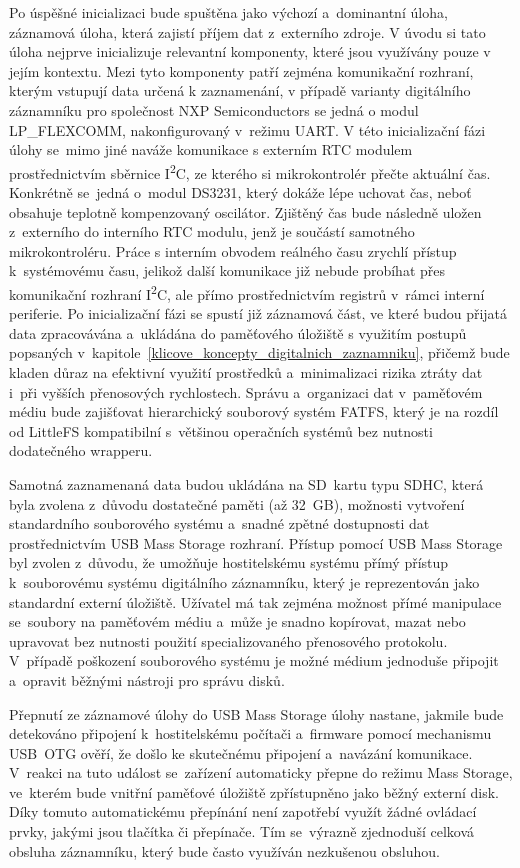 Po úspěšné inicializaci bude spuštěna jako výchozí a~dominantní úloha, záznamová úloha, která zajistí příjem dat z~externího zdroje. V úvodu si tato úloha nejprve inicializuje relevantní komponenty, které jsou využívány pouze v jejím kontextu. Mezi tyto komponenty patří zejména komunikační rozhraní, kterým vstupují data určená k zaznamenání, v případě varianty digitálního záznamníku pro společnost NXP Semiconductors se jedná o modul LP\_FLEXCOMM, nakonfigurovaný v~režimu UART. V této inicializační fázi úlohy se~mimo jiné naváže komunikace s externím RTC modulem prostřednictvím sběrnice I\textsuperscript{2}C, ze kterého si mikrokontrolér přečte aktuální čas. Konkrétně se~jedná o~modul DS3231, který dokáže lépe uchovat čas, neboť obsahuje teplotně kompenzovaný oscilátor. Zjištěný čas bude následně uložen z~externího do interního RTC modulu, jenž je součástí samotného mikrokontroléru. Práce s interním obvodem reálného času zrychlí přístup k~systémovému času, jelikož další komunikace již nebude probíhat přes komunikační rozhraní I\textsuperscript{2}C, ale přímo prostřednictvím registrů v~rámci interní periferie. Po inicializační fázi se spustí již záznamová část, ve které budou přijatá data zpracovávána a~ukládána do paměťového úložiště s využitím postupů popsaných v~kapitole~\ref{klicove_koncepty_digitalnich_zaznamniku}, přičemž bude kladen důraz na efektivní využití prostředků a~minimalizaci rizika ztráty dat i~při vyšších přenosových rychlostech. Správu a~organizaci dat v~paměťovém médiu bude zajišťovat hierarchický souborový systém FATFS, který je na rozdíl od LittleFS kompatibilní s~většinou operačních systémů bez nutnosti dodatečného wrapperu.

Samotná zaznamenaná data budou ukládána na SD~kartu typu SDHC, která byla zvolena z~důvodu dostatečné paměti (až 32~GB), možnosti vytvoření standardního souborového systému a~snadné zpětné dostupnosti dat prostřednictvím USB Mass Storage rozhraní. Přístup pomocí USB Mass Storage byl zvolen z~důvodu, že umožňuje hostitelskému systému přímý přístup k~souborovému systému digitálního záznamníku, který je reprezentován jako standardní externí úložiště. Užívatel má tak zejména možnost přímé manipulace se~soubory na paměťovém médiu a~může je snadno kopírovat, mazat nebo upravovat bez nutnosti použití specializovaného přenosového protokolu. V~případě poškození souborového systému je možné médium jednoduše připojit a~opravit běžnými nástroji pro správu disků.

Přepnutí ze záznamové úlohy do USB Mass Storage úlohy nastane, jakmile bude detekováno připojení k~hostitelskému počítači a~firmware pomocí mechanismu USB~OTG ověří, že došlo ke skutečnému připojení a~navázání komunikace. V~reakci na tuto událost se~zařízení automaticky přepne do režimu Mass Storage, ve~kterém bude vnitřní paměťové úložiště zpřístupněno jako běžný externí disk. Díky tomuto automatickému přepínání není zapotřebí využít žádné ovládací prvky, jakými jsou tlačítka či přepínače. Tím se~výrazně zjednoduší celková obsluha záznamníku, který bude často využíván nezkušenou obsluhou.

